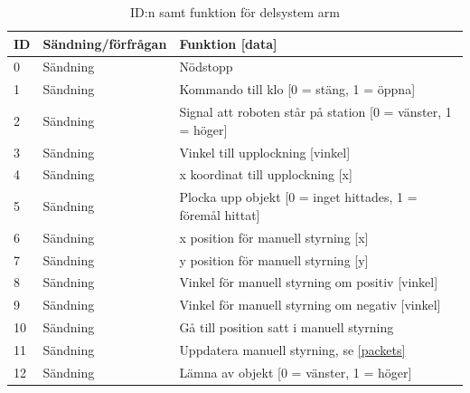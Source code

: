 \begin{table}[H]
\centering
\label{callbacks-arm}
\begin{tabularx}{\textwidth}{|l|l|X|}
\hline
\textbf{ID} & \textbf{Sändning/förfrågan} & \textbf{Funktion [data]} \\ \hline
0 & Sändning & Nödstopp \\ \hline
1 & Sändning & Kommando till klo [0 = stäng, 1 = öppna] \\ \hline
2 & Sändning & Signal att roboten står på station [0 = vänster, 1 = höger] \\ \hline
3 & Sändning & Vinkel till upplockning [vinkel] \\ \hline
4 & Sändning & x koordinat till upplockning [x] \\ \hline
5 & Sändning & Plocka upp objekt [0 = inget hittades, 1 = föremål hittat] \\ \hline
6 & Sändning & x position för manuell styrning [x] \\ \hline
7 & Sändning & y position för manuell styrning [y] \\ \hline
8 & Sändning & Vinkel för manuell styrning om positiv [vinkel] \\ \hline
9 & Sändning & Vinkel för manuell styrning om negativ [vinkel] \\ \hline
10 & Sändning & Gå till position satt i manuell styrning \\ \hline
11 & Sändning & Uppdatera manuell styrning, se \ref{packets} \\ \hline
12 & Sändning & Lämna av objekt [0 = vänster, 1 = höger] \\ \hline
\end{tabularx}
\caption{ID:n samt funktion för delsystem arm}
\end{table}

